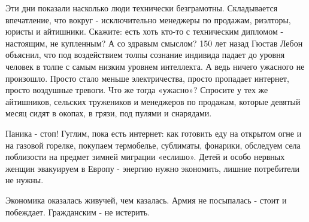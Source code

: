 Эти дни показали насколько люди технически безграмотны. Складывается
впечатление, что вокруг - исключительно менеджеры по продажам, риэлторы, юристы
и айтишники. Скажите: есть хоть кто-то с техническим дипломом - настоящим, не
купленным?  А со здравым смыслом? 150 лет назад Гюстав Лебон объяснил, что под
воздействием толпы сознание индивида падает до уровня человек в толпе с самым
низким уровнем интеллекта. А ведь ничего ужасного не произошло. Просто стало
меньше электричества, просто пропадает интернет, просто воздушные тревоги. Что
же тогда «ужасно»? Спросите у тех же айтишников, сельских тружеников и
менеджеров по продажам, которые девятый месяц сидят в окопах, в грязи, под
пулями и снарядами. 

Паника - стоп! Гуглим, пока есть интернет: как готовить еду на открытом огне и
на газовой горелке, покупаем термобелье, сублиматы, фонарики, обследуем села
поблизости на предмет зимней миграции «еслишо». Детей и особо нервных женщин
эвакуируем в Европу - энергию нужно экономить, лишние потребители не нужны. 

Экономика оказалась живучей, чем казалась. Армия не посыпалась - стоит и
побеждает. Гражданским - не истерить.

